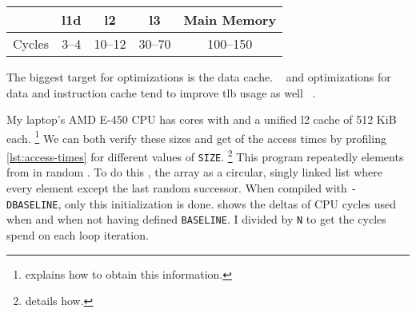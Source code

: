 \begin{center}
   \begin{tabular}{ r | c c c c }
             & \gls{l1d} & \gls{l2} & \gls{l3} & Main Memory \\ \hline
      Cycles & 3--4      & 10--12   & 30--70   & 100--150
   \end{tabular}
\end{center}
%

The biggest target for optimizations is the data cache.  ~\cite[31]{drepper2007} and optimizations for data and instruction cache
tend to improve \gls{tlb} usage as well%
~\cite[\href{https://youtu.be/WDIkqP4JbkE?t=11m53s}{11:53}]{scott-meyers-talk}.

My laptop's AMD E-450 CPU has cores with  and a unified \gls{l2} cache of 512 KiB each.%
\footnote{ explains how to obtain this information.}
We can both verify these sizes and get  of the access times by profiling
\cref{lst:access-times}
for different values of \texttt{SIZE}.%
\footnote{ details how.}
This program repeatedly  elements
from 
in random .
To do this
, the array  as a
circular, singly linked list where every element except the last 
random successor.  When compiled with \texttt{-DBASELINE}, only this
initialization is done.
 shows the deltas of CPU cycles used when and when not having
defined \texttt{BASELINE}.
I divided by \texttt{N} to get the cycles spend on each loop iteration.

%
\begin{comment}
   \begin{figure}
      \inputminted[firstline=9]{c}{access-times/access-times.c}
      \captionof{listing}{TODO}
      \label{lst:access-times}
   \end{figure}
\end{comment}

